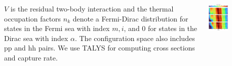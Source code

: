 \documentclass[25pt, a0paper, portrait]{tikzposter}
\begin{document}
\begin{columns}
{	$V$ is the residual two-body interaction and the thermal occupation factors $n_k$ denote a Fermi-Dirac distribution for states in the Fermi sea with index $m,i$, and $0$ for states in the Dirac sea with index $\alpha$. The configuration space also includes pp and hh pairs. We use TALYS for computing cross sections and capture rate.}

    {
        \begin{tikzfigure}
            \includegraphics[width=0.38\textwidth]{images/colormesh.pdf}
        \end{tikzfigure}
    }






\end{columns}
\end{document}

